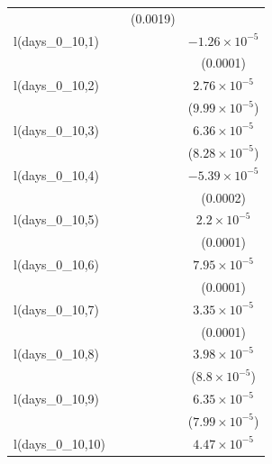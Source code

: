 \begin{tabular}{lccc}
                                    &          & (0.0019)              &   \\   
   l(days\_0\_10,1)                 &          &                       & $-1.26\times 10^{-5}$\\    
                                    &          &                       & (0.0001)\\   
   l(days\_0\_10,2)                 &          &                       & $2.76\times 10^{-5}$\\    
                                    &          &                       & ($9.99\times 10^{-5}$)\\    
   l(days\_0\_10,3)                 &          &                       & $6.36\times 10^{-5}$\\    
                                    &          &                       & ($8.28\times 10^{-5}$)\\    
   l(days\_0\_10,4)                 &          &                       & $-5.39\times 10^{-5}$\\    
                                    &          &                       & (0.0002)\\   
   l(days\_0\_10,5)                 &          &                       & $2.2\times 10^{-5}$\\    
                                    &          &                       & (0.0001)\\   
   l(days\_0\_10,6)                 &          &                       & $7.95\times 10^{-5}$\\    
                                    &          &                       & (0.0001)\\   
   l(days\_0\_10,7)                 &          &                       & $3.35\times 10^{-5}$\\    
                                    &          &                       & (0.0001)\\   
   l(days\_0\_10,8)                 &          &                       & $3.98\times 10^{-5}$\\    
                                    &          &                       & ($8.8\times 10^{-5}$)\\    
   l(days\_0\_10,9)                 &          &                       & $6.35\times 10^{-5}$\\    
                                    &          &                       & ($7.99\times 10^{-5}$)\\    
   l(days\_0\_10,10)                &          &                       & $4.47\times 10^{-5}$\\    

\end{tabular}
